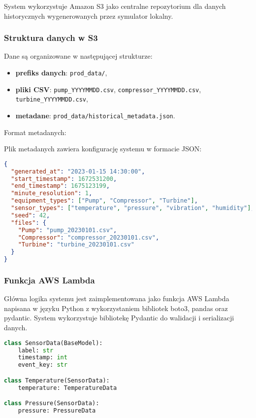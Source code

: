System wykorzystuje Amazon S3 jako centralne repozytorium dla danych historycznych wygenerowanych przez symulator lokalny.

\subsubsection{Struktura danych w S3}

Dane są organizowane w następującej strukturze:

\begin{itemize}
    \item \textbf{prefiks danych}: \texttt{prod\_data/},
    \item \textbf{pliki CSV}: \texttt{pump\_YYYYMMDD.csv}, \texttt{compressor\_YYYYMMDD.csv}, \texttt{turbine\_YYYYMMDD.csv},
    \item \textbf{metadane}: \texttt{prod\_data/historical\_metadata.json}.
\end{itemize}

Format metadanych:

Plik metadanych zawiera konfigurację systemu w formacie JSON:

\begin{lstlisting}[language=JSON, caption=Plik metadanych]
{
  "generated_at": "2023-01-15 14:30:00",
  "start_timestamp": 1672531200,
  "end_timestamp": 1675123199,
  "minute_resolution": 1,
  "equipment_types": ["Pump", "Compressor", "Turbine"],
  "sensor_types": ["temperature", "pressure", "vibration", "humidity"],
  "seed": 42,
  "files": {
    "Pump": "pump_20230101.csv",
    "Compressor": "compressor_20230101.csv", 
    "Turbine": "turbine_20230101.csv"
  }
}
\end{lstlisting}

\subsubsection{Funkcja AWS Lambda}
\label{subsec:aws_lambda}

Główna logika systemu jest zaimplementowana jako funkcja AWS Lambda napisana w języku Python z wykorzystaniem bibliotek boto3, pandas oraz pydantic. System wykorzystuje bibliotekę Pydantic do walidacji i serializacji danych.

\begin{lstlisting}[language=Python, caption=Klasy modeli danych]
class SensorData(BaseModel):
    label: str
    timestamp: int
    event_key: str

class Temperature(SensorData):
    temperature: TemperatureData

class Pressure(SensorData):
    pressure: PressureData
\end{lstlisting}

